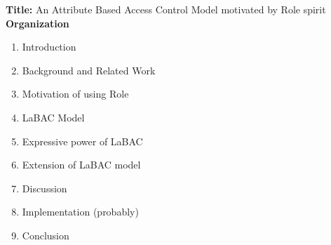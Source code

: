\textbf{Title:} An Attribute Based Access Control Model motivated by Role spirit \\
\textbf{Organization}

\begin{enumerate}
	\item Introduction
	\item Background and Related Work
	\item Motivation of using Role
	\item LaBAC Model	
	\item Expressive power of LaBAC
	\item Extension of LaBAC model
	\item Discussion
	\item Implementation (probably)
	\item Conclusion
	
\end{enumerate}
 
